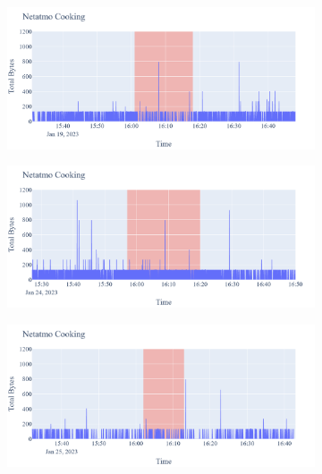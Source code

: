 \begin{figure}[H]
\begin{subfigure}[b]{0.47\textwidth}
    \end{subfigure}
    \begin{subfigure}[b]{0.47\textwidth}
        \centering
        \includegraphics[width=1.2\hsize]{figures/Netatmo_Cooking_Bytes_19.01.png}
    \end{subfigure}
    \begin{subfigure}[b]{0.47\textwidth}
        \centering
        \includegraphics[width=1.2\hsize]{figures/Netatmo_Cooking_Bytes_24.01.png}
    \end{subfigure}
    \begin{subfigure}[b]{0.47\textwidth}
        \centering
        \includegraphics[width=1.2\hsize]{figures/Netatmo_Cooking_Bytes_25.01.png}
    \end{subfigure}

\end{figure}
